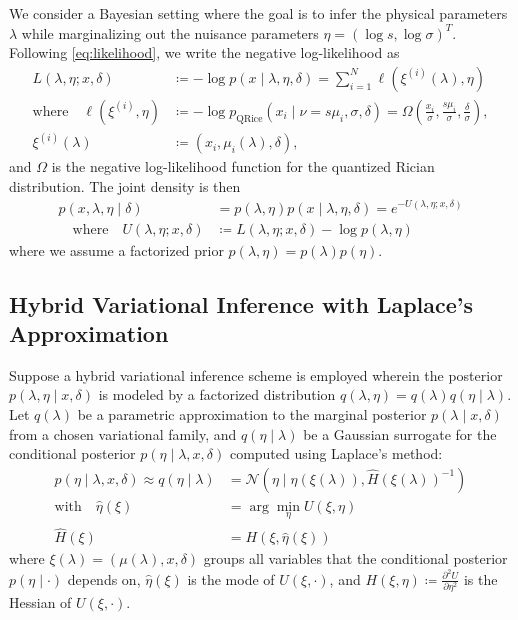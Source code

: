\documentclass{article}
\begin{document}
We consider a Bayesian setting where the goal is to infer the physical parameters $\lambda$ while marginalizing out the nuisance parameters $\eta = (\log s, \log \sigma)^T$.
Following \cref{eq:likelihood}, we write the negative log-likelihood as
%
\begin{align}\label{eq:negative-log-likelihood}
  L(\lambda, \eta; x, \delta)              & \coloneqq -\log p(x \mid \lambda, \eta, \delta) = \sum_{i=1}^N \ell(\xi^{(i)}(\lambda), \eta)                                                                      \\
  \text{where} \quad \ell(\xi^{(i)}, \eta) & \coloneqq -\log p_{\mathrm{QRice}}(x_i \mid \nu = s \mu_i, \sigma, \delta) = \Omega\left(\frac{x_i}{\sigma}, \frac{s \mu_i}{\sigma}, \frac{\delta}{\sigma}\right), \\
  \xi^{(i)}(\lambda)                       & \coloneqq (x_i, \mu_i(\lambda), \delta),
\end{align}
%
and $\Omega$ is the negative log-likelihood function for the quantized Rician distribution.
The joint density is then
%
\begin{align}
  p(x, \lambda, \eta \mid \delta) & = p(\lambda, \eta) p(x \mid \lambda, \eta, \delta) = e^{-U(\lambda, \eta; x, \delta)} \\
  \quad \text{where} \quad
  U(\lambda, \eta; x, \delta)     & \coloneqq L(\lambda, \eta; x, \delta) - \log p(\lambda, \eta)
\end{align}
%
where we assume a factorized prior $p(\lambda, \eta) = p(\lambda) p(\eta)$.

\subsection{Hybrid Variational Inference with Laplace's Approximation}

Suppose a hybrid variational inference scheme is employed wherein the posterior $p(\lambda, \eta \mid x, \delta)$ is modeled by a factorized distribution $q(\lambda, \eta) = q(\lambda) q(\eta \mid \lambda)$.
Let $q(\lambda)$ be a parametric approximation to the marginal posterior $p(\lambda \mid x, \delta)$ from a chosen variational family, and $q(\eta \mid \lambda)$ be a Gaussian surrogate for the conditional posterior $p(\eta \mid \lambda, x, \delta)$ computed using Laplace's method:
%
\begin{align}
  p(\eta \mid \lambda, x, \delta) \approx q(\eta \mid \lambda) & = \mathcal{N}(\eta \mid \hat{\eta}(\xi(\lambda)), \hat{H}(\xi(\lambda))^{-1}) \\
  \text{with} \quad
  \hat{\eta}(\xi)                                              & = \arg\min_{\eta} U(\xi, \eta) \label{eq:laplace-mode}                        \\
  \hat{H}(\xi)                                                 & = H(\xi, \hat{\eta}(\xi)) \label{eq:laplace-hessian}
\end{align}
%
where $\xi(\lambda) = (\mu(\lambda), x, \delta)$ groups all variables that the conditional posterior $p(\eta \mid \cdot)$ depends on, $\hat{\eta}(\xi)$ is the mode of $U(\xi, \cdot)$, and $H(\xi, \eta) \coloneqq \frac{\partial^2 U}{\partial \eta^2}$ is the Hessian of $U(\xi, \cdot)$.
\end{document}
